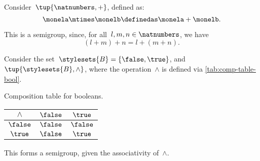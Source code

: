 \begin{example}
    \label{exa:natnum-semigroup}
    Consider~$\tup{\natnumbers,+}$, defined as:
    \begin{equation*}
        \label{eq:natnum-semigroup-definition}
        \monela \mtimes \monelb \definedas  \monela + \monelb.
    \end{equation*}

    This is a semigroup, since, for all~$l,m, n \in \natnumbers$, we have
    \begin{equation}
    (l+m)
        +n
        =l+(m+n).
    \end{equation}
\end{example}



\begin{example}[Booleans]
    \label{exa:booleans-table}
    \label{ex:bool_semigroup}
    Consider the set~$\stylesets{B}=\{\false, \true\}$, and~$\tup{\stylesets{B},\wedge}$, where the operation~$\wedge$ is defined via \cref{tab:comp-table-bool}.

    \begin{margintable}
        \caption{Composition table for booleans.}
        \label{tab:comp-table-bool}
        \begin{tabular}{c|cc}
            $\wedge$ & $\false$ & $\true$  \\
            \hline
            $\false$ & $\false$ & $\false$ \\
            $\true$  & $\false$ & $\true$
        \end{tabular}
    \end{margintable}

    This forms a semigroup, given the associativity of~$\wedge$.
\end{example}

